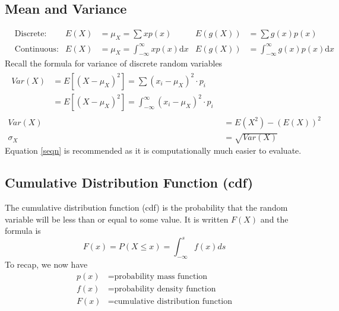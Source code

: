\subsection{Mean and Variance}  %
\begin{align}
     & \text{Discrete:}   & E(X) & =\mu_X=\sum xp(x)                             & E(g(X)) & =\sum g(x)p(x)                            \\
     & \text{Continuous:} & E(X) & =\mu_X=\int_{-\infty}^{\infty} xp(x)\text{d}x & E(g(X)) & =\int_{-\infty}^{\infty}g(x)p(x)\text{d}x
\end{align}
Recall the formula for variance of discrete random variables
\begin{align}
    \begin{split}
        Var(X) & =E[{(X-\mu_X)}^2]=\sum{(x_i-\mu_X)}^2\cdot p_i \\
               & =E[{(X-\mu_X)}^2]=\int_{-\infty}^\infty{(x_i-\mu_X)}^2\cdot p_i
    \end{split} \\
    Var(X)   & =E(X^2)-(E(X))^2 \label{seqn} \\
    \sigma_X & =\sqrt{Var(X)}
\end{align}
Equation \ref*{seqn} is recommended as it is computationally much easier to evaluate.

\subsection{Cumulative Distribution Function (cdf)}  %
The cumulative distribution function (cdf) is the probability that the random variable will be less than or equal to some value. It is written $F(X)$ and the formula is
\begin{equation}
    F(x)=P(X\leq x)=\int_{-\infty}^{s} f(x)ds
\end{equation}
To recap, we now have
\begin{align}
    p(x) & = \text{probability mass function}        \\
    f(x) & = \text{probability density function}     \\
    F(x) & = \text{cumulative distribution function}
\end{align}

